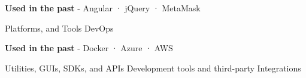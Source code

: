 \begin{cventries}
{\begin{cvitems}
        \item {\textbf{Used in the past} \hspace{0.03cm} - \hspace{0.03cm} Angular \hspace{0.03cm} · \hspace{0.03cm} jQuery \hspace{0.03cm} · \hspace{0.03cm} MetaMask \\} %
      \end{cvitems}
    }
  \cventry
    {Platforms, and Tools} %
    {DevOps} %
    {} %
    {} %
    {
      \begin{cvitems} %
        \item {\textbf{Used in the past} \hspace{0.03cm} - \hspace{0.03cm} Docker \hspace{0.03cm} · \hspace{0.03cm} Azure \hspace{0.03cm} · \hspace{0.03cm} AWS \\} %
      \end{cvitems}
    }
  \cventry
    {Utilities, GUIs, SDKs, and APIs} %
    {Development tools and third-party Integrations} %

\end{cventries}
